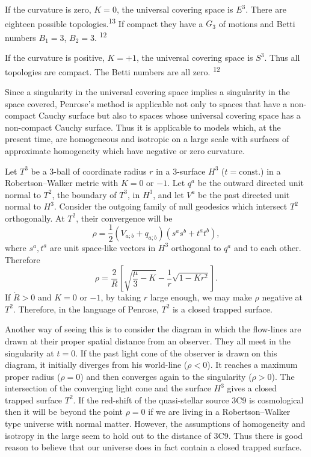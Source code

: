 If the curvature is zero, $K=0$, the universal covering space is $E^3$.
There are eighteen possible topologies.\textsuperscript{13} If compact they
have a $G_3$ of motions and Betti numbers $B_1=3$, $B_2=3$.
\textsuperscript{12}

If the curvature is positive, $K=+1$, the universal covering space is $S^3$.
Thus all topologies are compact. The Betti numbers are all zero.
\textsuperscript{12}

Since a singularity in the universal covering space implies a singularity in
the space covered, Penrose's method is applicable not only to spaces that have
a non-compact Cauchy surface but also to spaces whose universal covering space
has a non-compact Cauchy surface. Thus it is applicable to models which, at
the present time, are homogeneous and isotropic on a large scale with surfaces
of approximate homogeneity which have negative or zero curvature.


Let $T^3$ be a 3-ball of coordinate radius $r$ in a 3-surface
$H^3$ ($t=\text{const.}$) in a Robertson--Walker metric with $K=0$ or $-1$.
Let $q^a$ be the outward directed unit normal to $T^2$, the boundary of $T^3$,
in $H^3$, and let $V^a$ be the past directed unit normal to $H^3$. Consider
the outgoing family of null geodesics which intersect $T^2$ orthogonally. At
$T^2$, their convergence will be
\[
\rho
=\frac{1}{2}\left(V_{a;b}+q_{a;b}\right)
\left(s^as^b+t^at^b\right),
\]
where $s^a,t^a$ are unit space-like vectors in $H^3$ orthogonal to $q^a$ and
to each other. Therefore
\[
\rho
=\frac{2}{R}
\left[
\sqrt{\frac{\mu}{3}-K}
-\frac{1}{r}\sqrt{1-Kr^2}
\right].
\]
If $\dot R>0$ and $K=0$ or $-1$, by taking $r$ large enough, we may make
$\rho$ negative at $T^2$. Therefore, in the language of Penrose, $T^2$ is a
closed trapped surface.

Another way of seeing this is to consider the diagram in which the flow-lines
are drawn at their proper spatial distance from an observer. They all meet in
the singularity at $t=0$. If the past light cone of the observer is drawn on
this diagram, it initially diverges from his world-line ($\rho<0$). It reaches
a maximum proper radius ($\rho=0$) and then converges again to the singularity
($\rho>0$). The intersection of the converging light cone and the surface
$H^3$ gives a closed trapped surface $T^2$. If the red-shift of the
quasi-stellar source 3C9 is cosmological then it will be beyond the point
$\rho=0$ if we are living in a Robertson--Walker type universe with normal
matter. However, the assumptions of homogeneity and isotropy in the large
seem to hold out to the distance of 3C9. Thus there is good reason to believe
that our universe does in fact contain a closed trapped surface.

